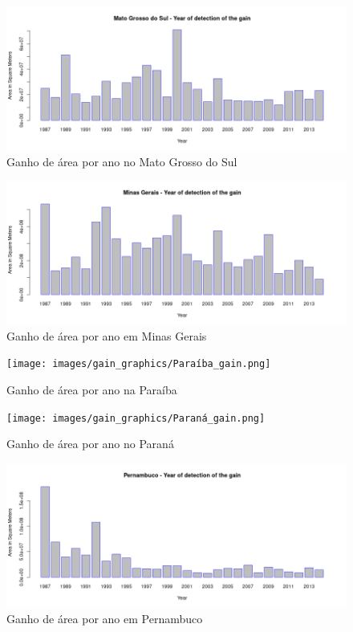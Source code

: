 \begin{figure}[H]
    \centering
    \includegraphics[scale=.5]{images/gain_graphics/Mato Grosso do Sul_gain.png}
    \caption{Ganho de área por ano no Mato Grosso do Sul}
    \label{fig:gain_mato_grosso_sul}
\end{figure}

\begin{figure}[H]
    \centering
    \includegraphics[scale=.5]{images/gain_graphics/Minas Gerais_gain.png}
    \caption{Ganho de área por ano em Minas Gerais}
    \label{fig:gain_minas_gerais}
\end{figure}

\begin{figure}[H]
    \centering
    \texttt{[image: images/gain\_graphics/Paraíba\_gain.png]}
    \caption{Ganho de área por ano na Paraíba}
    \label{fig:gain_paraiba}
\end{figure}

\begin{figure}[H]
    \centering
    \texttt{[image: images/gain\_graphics/Paraná\_gain.png]}
    \caption{Ganho de área por ano no Paraná}
    \label{fig:gain_parana}
\end{figure}

\begin{figure}[H]
    \centering
    \includegraphics[scale=.5]{images/gain_graphics/Pernambuco_gain.png}
    \caption{Ganho de área por ano em Pernambuco}
    \label{fig:gain_pernambuco}
\end{figure}

